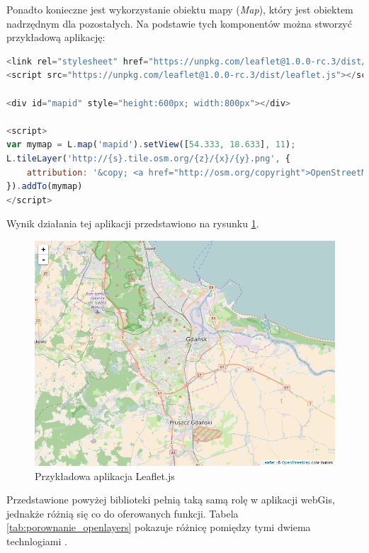 Ponadto konieczne jest wykorzystanie obiektu mapy (\textit{Map}), który jest obiektem nadrzędnym dla pozostałych.
Na podstawie tych komponentów można stworzyć przykładową aplikację:
\begin{lstlisting}[frame=L, language=JavaScript]
<link rel="stylesheet" href="https://unpkg.com/leaflet@1.0.0-rc.3/dist/leaflet.css" />
<script src="https://unpkg.com/leaflet@1.0.0-rc.3/dist/leaflet.js"></script>
 
<div id="mapid" style="height:600px; width:800px"></div>

<script>
var mymap = L.map('mapid').setView([54.333, 18.633], 11);
L.tileLayer('http://{s}.tile.osm.org/{z}/{x}/{y}.png', {
    attribution: '&copy; <a href="http://osm.org/copyright">OpenStreetMap</a> contributors'
}).addTo(mymap)
</script>
\end{lstlisting}

Wynik działania tej aplikacji przedstawiono na rysunku \ref{fig:leaflet_example}.

\begin{figure}[h!]
    \centering
    \includegraphics[width=1.0\textwidth]{img/leaflet_example.png}
    \caption{Przykładowa aplikacja Leaflet.js}
    \label{fig:leaflet_example}
\end{figure}

Przedstawione powyżej biblioteki pełnią taką samą rolę w aplikacji webGis, jednakże różnią się co do oferowanych funkcji.
Tabela \ref{tab:porownanie_openlayers} pokazuje różnicę pomiędzy tymi dwiema technlogiami \cite{website:OpenLayersVSLeaflet}.

